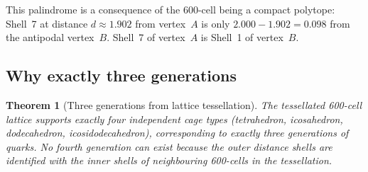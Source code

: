 \documentclass[11pt,letterpaper]{article}
\newtheorem{theorem}{Theorem}[section]
\begin{document}
This palindrome is a consequence of the 600-cell being a compact
polytope: Shell~7 at distance $d \approx 1.902$ from vertex~$A$ is
only $2.000 - 1.902 = 0.098$ from the antipodal vertex~$B$.
Shell~7 of vertex~$A$ is Shell~1 of vertex~$B$.

\subsection{Why exactly three generations}

\begin{theorem}[Three generations from lattice tessellation]
\label{thm:generations}
The tessellated 600-cell lattice supports exactly four independent
cage types (tetrahedron, icosahedron, dodecahedron,
icosidodecahedron), corresponding to exactly three generations of
quarks.  No fourth generation can exist because the outer distance
shells are identified with the inner shells of neighbouring
600-cells in the tessellation.
\end{theorem}
\end{document}
